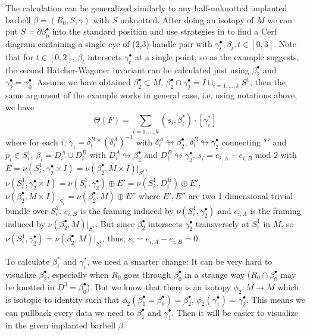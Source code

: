 The calculation can be generalized similarly to any half-unknotted implanted barbell $\beta=(R_0, S, \gamma)$ with $S$ unknotted. After doing an isotopy of $M$ we can put $S=\partial \beta_0^\bullet$ into the standard position and use strategies in  to find a Cerf diagram containing a single eye of (2,3)-handle pair with $\gamma_t^\bullet, \beta_t, t\in [0,3]$. Note that for $t\in [0,2]$, $\beta_t$ intersects $\gamma_t^\bullet$ at a single point, so as the example suggests, the second Hatcher-Wagoner invariant can be calculated just using $\beta_2^\bullet$ and $\gamma_2^\bullet=\gamma_0^\bullet$. Assume we have obtained $\beta_2^\bullet\subset M$, $\beta_2^\bullet \cap \gamma_2^\bullet=I\sqcup _{i=1,...,k} S^1$, then the same argument of the example works in general case, i.e. using notations above, we have
$$\Theta(F)=\sum_{i=1,...,k}(s_i, \beta_i^*)\cdot [\gamma_i^*]$$
where for each $i$, $\gamma_i=\delta^B_i*(\delta^A_i)^{-1}$ with $\delta^A_i\looparrowright \beta_2^\bullet$, $\delta^B_i\looparrowright \gamma_2^\bullet$ connecting $*'$ and $p_i\in S^1_i$, $\beta_i=D^A_i\cup D^B_i$ with $D_i^A\looparrowright \beta_2^\bullet$ and $D^B_i\looparrowright \gamma_2^\bullet$, $s_i=e_{i,A}-e_{i,B} \text{ mod }2$ with $E=\nu (S_i^1, \gamma_2^\bullet \times I)=\nu (\beta_2^\bullet , M\times I)|_{S_i^1}$. $\nu (S_i^1, \gamma_2^\bullet \times I)=\nu (S^1_i, \gamma_2^\bullet)\oplus E'=\nu (S_i^1, D_i^B)\oplus E'$, $\nu (\beta_2^\bullet, M\times I)|_{S_i^1}=\nu (\beta_2^\bullet, M)\oplus E''$ where $E',E''$ are two 1-dimensional trivial bundle over $S_i^1$. $e_{i,B}$ is the framing induced by $\nu (S_i^1, \gamma_2^\bullet)$ and $e_{i,A}$ is the framing induced by $\nu (\beta_2^\bullet,M)|_{S_i^1}$. But since $\beta_2^\bullet$ intersects $\gamma_2^\bullet$ transversely at $S_i^1$ in $M$, so $\nu (S_i^1, \gamma_2^\bullet)=\nu (\beta_2^\bullet,M)|_{S_i^1}$, thus, $s_i=e_{i,A}-e_{i,B}=0$.

To calculate $\beta_i^*$ and $\gamma_i^*$, we need a smarter change: It can be very hard to visualize $\beta_2^\bullet$, especially when $R_0$ goes through $\beta_0^\bullet$ in a strange way ($R_0\cap \beta_0^\bullet$ may be knotted in $D^3=\beta_0^\bullet$). But we know that there is an isotopy $\phi_2: M\to M$ which is isotopic to identity such that $\phi_2(\beta_1^\bullet=\beta_0^\bullet)=\beta_2^\bullet$, $\phi_2(\gamma_1^\bullet)=\gamma_2^\bullet$. This means we can pullback every data we need to $\beta_1^\bullet$ and $\gamma_1^\bullet$. Then it will be easier to visualize in the given implanted barbell $\beta$. 

